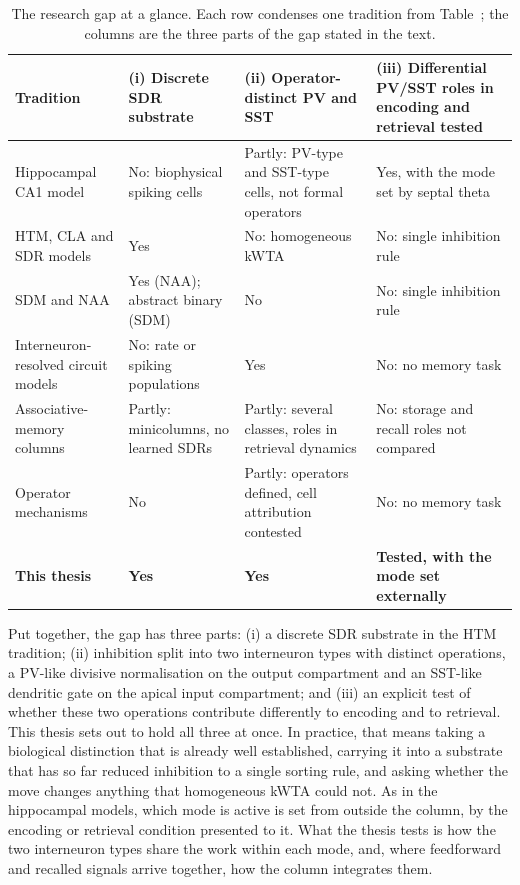 \begin{table}[htbp]
\centering
\small
\setlength{\tabcolsep}{3pt}
\renewcommand{\arraystretch}{1.15}
\begin{tabular}{>{\raggedright\arraybackslash}p{2.9cm}>{\raggedright\arraybackslash}p{2.8cm}>{\raggedright\arraybackslash}p{3.0cm}>{\raggedright\arraybackslash}p{3.0cm}}
\hline
\textbf{Tradition} & \textbf{(i) Discrete SDR substrate} & \textbf{(ii) Operator-distinct PV and SST} & \textbf{(iii) Differential PV/SST roles in encoding and retrieval tested} \\
\hline
Hippocampal CA1 model & No: biophysical spiking cells & Partly: PV-type and SST-type cells, not formal operators & Yes, with the mode set by septal theta \\
HTM, CLA and SDR models & Yes & No: homogeneous kWTA & No: single inhibition rule \\
SDM and NAA & Yes (NAA); abstract binary (SDM) & No & No: single inhibition rule \\
Interneuron-resolved circuit models & No: rate or spiking populations & Yes & No: no memory task \\
Associative-memory columns & Partly: minicolumns, no learned SDRs & Partly: several classes, roles in retrieval dynamics & No: storage and recall roles not compared \\
Operator mechanisms & No & Partly: operators defined, cell attribution contested & No: no memory task \\
\hline
\textbf{This thesis} & \textbf{Yes} & \textbf{Yes} & \textbf{Tested, with the mode set externally} \\
\hline
\end{tabular}
\caption{The research gap at a glance. Each row condenses one tradition from
Table~; the columns are the three parts of the
gap stated in the text.}
\label{tab:gap-matrix}
\end{table}

Put together, the gap has three parts: (i) a discrete SDR substrate in the HTM
tradition; (ii) inhibition split into two interneuron types with distinct
operations, a PV-like divisive normalisation on the output compartment and an
SST-like dendritic gate on the apical input compartment; and (iii) an explicit
test of whether these two operations contribute differently to encoding and to
retrieval. This thesis sets out to hold all three at once. In practice, that
means taking a biological distinction that is already well established,
carrying it into a substrate that has so far reduced inhibition to a single
sorting rule, and asking whether the move changes anything that homogeneous
kWTA could not. As in the hippocampal models, which mode is active is set from
outside the column, by the encoding or retrieval condition presented to it.
What the thesis tests is how the two interneuron types share the work within
each mode, and, where feedforward and recalled signals arrive together, how the
column integrates them.

